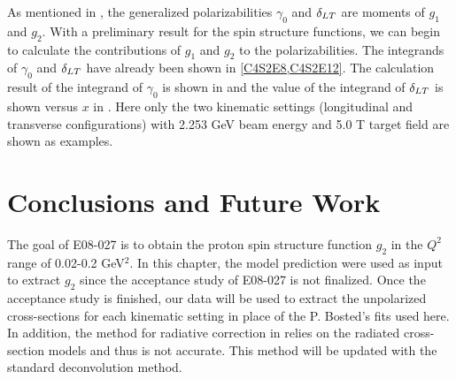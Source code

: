 
As mentioned in , the generalized polarizabilities $\gamma_0$ and $\delta_{LT}$ are moments of $g_1$ and $g_2$. With a preliminary result for the spin structure functions, we can begin to calculate the contributions of $g_1$ and $g_2$ to the polarizabilities. The integrands of $\gamma_0$ and $\delta_{LT}$ have already been shown in \cref{C4S2E8,C4S2E12}. The calculation result of the integrand of $\gamma_0$ is shown in  and the value of the integrand of $\delta_{LT}$ is shown versus $x$ in . Here only the two kinematic settings (longitudinal and transverse configurations) with 2.253 GeV beam energy and 5.0 T target field are shown as examples.


\section{Conclusions and Future Work}
\label{C8S6}

The goal of E08-027 is to obtain the proton spin structure function $g_2$ in the $Q^2$ range of 0.02-0.2 GeV${}^2$. In this chapter, the model prediction were used as input to extract $g_2$ since the acceptance study of E08-027 is not finalized. Once the acceptance study is finished, our data will be used to extract the unpolarized cross-sections for each kinematic setting in place of the P. Bosted's fits used here. In addition, the method for radiative correction in  relies on the radiated cross-section models and thus is not accurate. This method will be updated with the standard deconvolution method.

